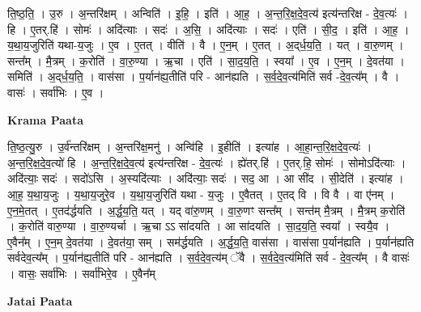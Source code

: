 \documentclass[17pt]{extarticle}
\begin{document}
ति॒ष्ठ॒ति॒ । उ॒रु । अ॒न्तरि॑क्षम् । अन्विति॑ । इ॒हि॒ । इति॑ । आ॒ह॒ । अ॒न्त॒रि॒क्ष॒दे॒व॒त्य॑ इत्य॑न्तरिक्ष - दे॒व॒त्यः॑ । हि । ए॒तर्.हि॑ । सोमः॑ । अदि॑त्याः । सदः॑ । अ॒सि॒ । अदि॑त्याः । सदः॑ । एति॑ । सी॒द॒ । इति॑ । आ॒ह॒ । य॒था॒य॒जुरिति॑ यथा-य॒जुः । ए॒व । ए॒तत् । वीति॑ । वै । ए॒न॒म् । ए॒तत् । अ॒द्‌र्ध॒य॒ति॒ । यत् । वा॒रु॒णम् । सन्त᳚म् । मै॒त्रम् । क॒रोति॑ । वा॒रु॒ण्या । ऋ॒चा । एति॑ । सा॒द॒य॒ति॒ । स्वया᳚ । ए॒व । ए॒न॒म् । दे॒वत॑या । समिति॑ । अ॒द्‌र्ध॒य॒ति॒ । वास॑सा । प॒र्यान॑ह्य॒तीति॑ परि - आन॑ह्यति । स॒र्व॒दे॒व॒त्य॑मिति॑ सर्व -दे॒व॒त्य᳚म् । वै । वासः॑ । सर्वा॑भिः । ए॒व ।  \newline


\textbf{Krama Paata} \newline

ति॒ष्ठ॒त्यु॒रु । उ॒र्व॑न्तरि॑क्षम् । अ॒न्तरि॑क्ष॒मनु॑ । अन्वि॑हि । इ॒हीति॑ । इत्या॑ह । आ॒हा॒न्त॒रि॒क्ष॒दे॒व॒त्यः॑ । अ॒न्त॒रि॒क्ष॒दे॒व॒त्यो॑ हि । अ॒न्त॒रि॒क्ष॒दे॒व॒त्य॑ इत्य॑न्तरिक्ष - दे॒व॒त्यः॑ । ह्ये॑तर्.हि॑ । ए॒तर्.हि॒ सोमः॑ । सोमोऽदि॑त्याः । अदि॑त्याः॒ सदः॑ । सदो॑ऽसि । अ॒स्यदि॑त्याः । अदि॑त्याः॒ सदः॑ । सद॒ आ । आ सी॑द । सी॒देति॑ । इत्या॑ह । आ॒ह॒ य॒था॒य॒जुः । य॒था॒य॒जुरे॒व । य॒था॒य॒जुरिति॑ यथा - य॒जुः । ए॒वैतत् । ए॒तद् वि । वि वै । वा ए॑नम् । ए॒न॒मे॒तत् । ए॒तद॑र्द्धयति । अ॒र्द्ध॒य॒ति॒ यत् । यद् वा॑रु॒णम् । वा॒रु॒णꣳ सन्त᳚म् । सन्त॑म् मै॒त्रम् । मै॒त्रम् क॒रोति॑ । क॒रोति॑ वारु॒ण्या । वा॒रु॒ण्यर्चा । ऋ॒चा ऽऽ सा॑दयति । आ सा॑दयति । सा॒द॒य॒ति॒ स्वया᳚ । स्वयै॒व । ए॒वैन᳚म् । ए॒न॒म् दे॒वत॑या । दे॒वत॑या॒ सम् । सम॑र्द्धयति । अ॒र्द्ध॒य॒ति॒ वास॑सा । वास॑सा प॒र्यान॑ह्यति । प॒र्यान॑ह्यति सर्वदेव॒त्य᳚म् । प॒र्यान॑ह्य॒तीति॑ परि - आन॑ह्यति । स॒र्व॒दे॒व॒त्य॑म् ॅवै । स॒र्व॒दे॒व॒त्य॑मिति॑ सर्व - दे॒व॒त्य᳚म् । वै वासः॑ । वासः॒ सर्वा॑भिः । सर्वा॑भिरे॒व । ए॒वैन᳚म् \newline

\textbf{Jatai Paata} \newline
\end{document}
